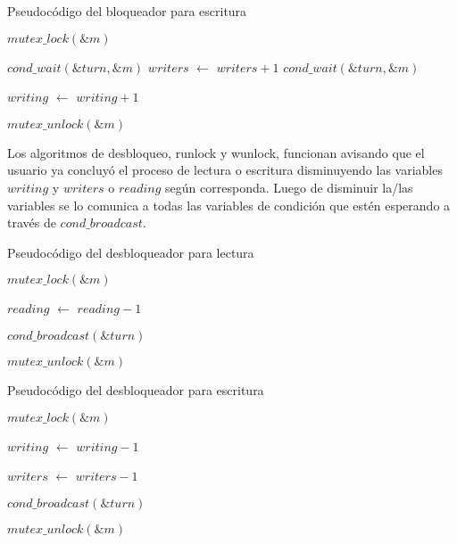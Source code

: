 \begin{algorithm}[H]
  \begin{algorithmic}[1]
  \caption{Pseudocódigo del bloqueador para escritura}
  \label{algo:3-1}
	\State $mutex\_lock(\&m)$

		\State $ cond\_wait(\&turn, \&m) $
	\EndWhile
	\State $writers$ $\leftarrow$ $writers + 1$
		\State $ cond\_wait(\&turn, \&m) $
	\EndWhile
	
	\State $writing$ $\leftarrow$ $writing + 1$

	\State $mutex\_unlock(\&m)$

	\EndProcedure
	\end{algorithmic}
\end{algorithm}

Los algoritmos de desbloqueo, runlock y wunlock, funcionan avisando que el usuario ya concluyó el proceso de lectura o escritura disminuyendo las variables $writing$ y $writers$ o $reading$ según corresponda. Luego de disminuir la/las variables se lo comunica a todas las variables de condición que estén esperando a través de $cond\_broadcast$.

\begin{algorithm}[H]
  \begin{algorithmic}[1]
  \caption{Pseudocódigo del desbloqueador para lectura}
  \label{algo:3-1}
	\State $mutex\_lock(\&m)$

	\State $reading$ $\leftarrow$ $reading - 1$
	
	\State $cond\_broadcast(\&turn)$

	\State $mutex\_unlock(\&m)$

	\EndProcedure
	\end{algorithmic}
\end{algorithm}

\begin{algorithm}[H]
  \begin{algorithmic}[1]
  \caption{Pseudocódigo del desbloqueador para escritura}
  \label{algo:3-1}
	\State $mutex\_lock(\&m)$

	\State $writing$ $\leftarrow$ $writing - 1$
	
	\State $writers$ $\leftarrow$ $writers - 1$
	
	\State $cond\_broadcast(\&turn)$

	\State $mutex\_unlock(\&m)$

	\EndProcedure
	\end{algorithmic}
\end{algorithm}

